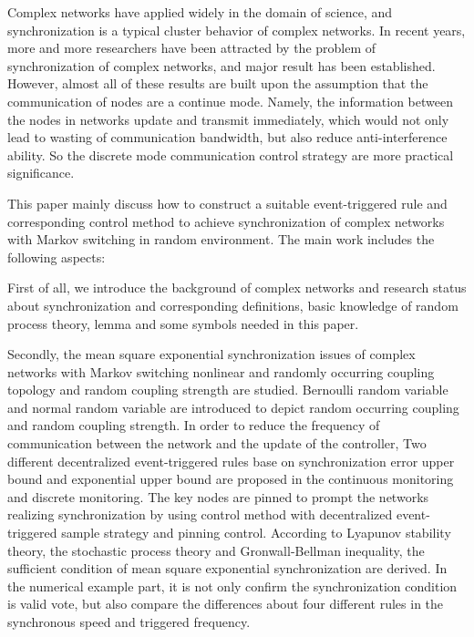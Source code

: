 \begin{englishabstract}
\vspace{2ex}
Complex networks have applied widely in the domain of science, and synchronization is a typical cluster behavior of complex networks. In recent years, more and more researchers have been attracted by the problem of synchronization of complex networks, and major result has been established. However, almost all of these results are built upon the assumption that the communication of nodes are a continue mode.  Namely, the information between the nodes in networks update and transmit immediately, which would not only lead to wasting of communication bandwidth, but also reduce anti-interference ability. So the discrete mode communication control strategy are more practical significance.

This paper mainly discuss how to construct a suitable event-triggered rule and corresponding control method to achieve synchronization of complex networks with Markov switching in random environment. The main work includes the following aspects:

First of all, we introduce the background of complex networks and research status about synchronization and corresponding definitions, basic knowledge of random process theory, lemma and some symbols needed in this paper.

Secondly, the mean square exponential synchronization issues of complex networks with Markov switching nonlinear and randomly occurring coupling topology and random coupling strength are studied. Bernoulli random variable and normal random variable are introduced to depict random occurring coupling and random coupling strength. In order to reduce the frequency of communication between the network and the update of the controller, Two different decentralized event-triggered rules base on synchronization error upper bound and exponential upper bound are proposed in the continuous monitoring and discrete monitoring. The key nodes are pinned to prompt the networks realizing synchronization by using control method with decentralized event-triggered sample strategy and pinning control. According to Lyapunov stability theory, the stochastic process theory and Gronwall-Bellman inequality, the sufficient condition of mean square exponential synchronization are derived. In the numerical example part, it is not only confirm the synchronization condition is valid vote, but also compare the differences about four different rules in the synchronous speed and triggered frequency.


\end{englishabstract}
